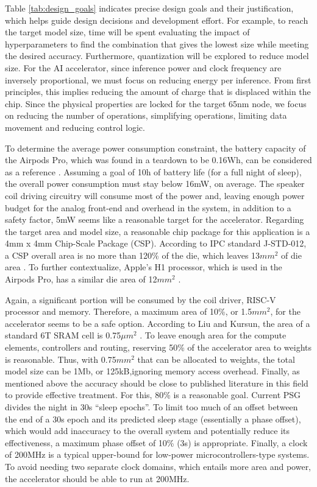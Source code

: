 \documentclass[12pt, hidelinks, draft]{article}
\begin{document}
Table \ref{tab:design_goals} indicates precise design goals and their justification, which helps guide design decisions and development effort. For example, to reach the target
model size, time will be spent evaluating the impact of hyperparameters to find the combination that gives the lowest size while meeting the desired accuracy. Furthermore,
quantization will be explored to reduce model size. For the AI accelerator, since inference power and clock frequency are inversely proportional, we must focus on reducing energy
per inference. From first principles, this implies reducing the amount of charge that is displaced within the chip. Since the physical properties are locked for the target 65nm node,
we focus on reducing the number of operations, simplifying operations, limiting data movement and reducing control logic.

To determine the average power consumption constraint, the battery capacity of the Airpods Pro, which was found in a teardown to be 0.16Wh, can be considered as a reference
\cite*{AirpodsIfixitTeardown}. Assuming a goal of 10h of battery life (for a full night of sleep), the overall power consumption must stay below 16mW, on average. The speaker coil
driving circuitry will consume most of the power and, leaving enough power budget for the analog front-end and overhead in the system, in addition to a safety factor, 5mW seems
like a reasonable target for the accelerator. Regarding the target area and model size, a reasonable chip package for this application is a 4mm x 4mm Chip-Scale Package (CSP).
According to IPC standard J-STD-012, a CSP overall area is no more than 120\% of the die, which leaves 13$mm^2$ of die area \cite*{J_STD_012}. To further contextualize, Apple's
H1 processor, which is used in the Airpods Pro, has a similar die area of 12$mm^2$ \cite*{H1DieSize}.

Again, a significant portion will be consumed by the coil driver, RISC-V processor and memory. Therefore, a maximum area of 10\%, or 1.5$mm^2$, for the accelerator seems to be a safe
option. According to Liu and Kursun, the area of a standard 6T SRAM cell is 0.75$\mu m^2$ \cite*{liu2008characterization}. To leave enough area for the compute elements, controllers
and routing, reserving 50\% of the accelerator area to weights is reasonable. Thus, with 0.75$mm^2$ that can be allocated to weights, the total model size can be 1Mb, or 125kB,ignoring
memory access overhead. Finally, as mentioned above the accuracy should be close to published literature in this field to provide effective treatment. For this, 80\% is a reasonable
goal. Current PSG divides the night in 30s ``sleep epochs''. To limit too much of an offset between the end of a 30s epoch and its predicted sleep stage (essentially a phase offset),
which would add inaccuracy to the overall system and potentially reduce its effectiveness, a maximum phase offset of 10\% (3s) is appropriate. Finally, a clock of 200MHz is a typical
upper-bound for low-power microcontrollers-type systems. To avoid needing two separate clock domains, which entails more area and power, the accelerator should be able to run at 200MHz.
\end{document}
